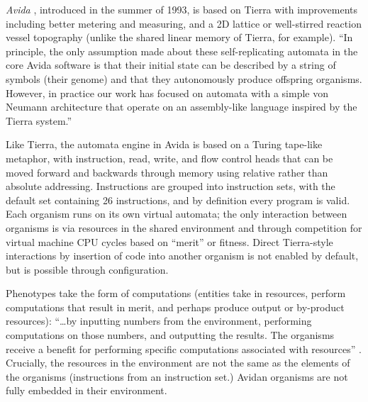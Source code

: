 \emph{Avida} \parencite{Ofria2004}, introduced in the summer of 1993, is based on Tierra with improvements including better metering and measuring, and a 2D lattice or well-stirred reaction vessel topography (unlike the shared linear memory of Tierra, for example). ``In principle, the only assumption made about these self-replicating automata in the core Avida software is that their initial state can be described by a string of symbols (their genome) and that they autonomously produce offspring organisms. However, in practice our work has focused on automata with a simple von Neumann architecture that operate on an assembly-like language inspired by the Tierra system.''

Like Tierra, the automata engine in Avida is based on a Turing tape-like metaphor, with instruction, read, write, and flow control heads that can be moved forward and backwards through memory using relative rather than absolute addressing. Instructions are grouped into instruction sets, with the default set containing 26 instructions, and by definition every program is valid. Each organism runs on its own virtual automata; the only interaction between organisms is via resources in the shared environment and through competition for virtual machine CPU cycles based on ``merit'' or fitness. Direct Tierra-style interactions by insertion of code into another organism is not enabled by default, but is possible through configuration. 

Phenotypes take the form of computations (entities take in resources, perform computations that result in merit, and perhaps produce output or by-product resources): ``\ldots by inputting numbers from the environment, performing computations on those numbers, and outputting the results. The organisms receive a benefit for performing specific computations associated with resources'' \parencite{Ofria2004}. Crucially, the resources in the environment are not the same as the elements of the organisms (instructions from an instruction set.) Avidan organisms are not fully embedded in their environment.


